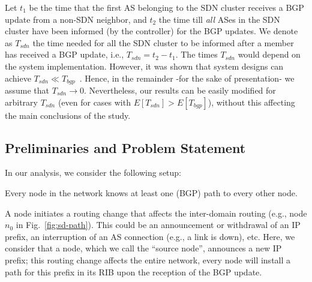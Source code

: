 Let $t_{1}$ be the time that the first AS belonging to the SDN cluster receives a BGP update from a non-SDN neighbor, and $t_{2}$ the time till \textit{all} ASes in the SDN cluster have been informed (by the controller) for the BGP updates. We denote as $T_{sdn}$ the time needed for all the SDN cluster to be informed after a member has received a BGP update, i.e., $T_{sdn} = t_{2}-t_{1}$. The times $T_{sdn}$ would depend on the system implementation. However, it was shown that system designs can achieve $T_{sdn}\ll T_{bgp}$~\cite{supercharge-me-2015}. Hence, in the remainder -for the sake of presentation- we assume that $T_{sdn}\rightarrow 0$. Nevertheless, our results can be easily modified for arbitrary $T_{sdn}$ (even for cases with $E[T_{sdn}] > E[T_{bgp}]$), without this affecting the main conclusions of the study.






\subsection{Preliminaries and Problem Statement}
\noindent In our analysis, we consider the following setup: 

Every node in the network knows at least one (BGP) path to every other node.

A node initiates a routing change that affects the inter-domain routing (e.g., node $n_{0}$ in Fig.~\ref{fig:sd-path}). This could be an announcement or withdrawal of an IP prefix, an interruption of an AS connection (e.g., a link is down), etc. Here, we consider that a node, which we call the ``source node'', announces a new IP prefix; this routing change affects the entire network, every node will install a path for this prefix in its RIB upon the reception of the BGP update.

